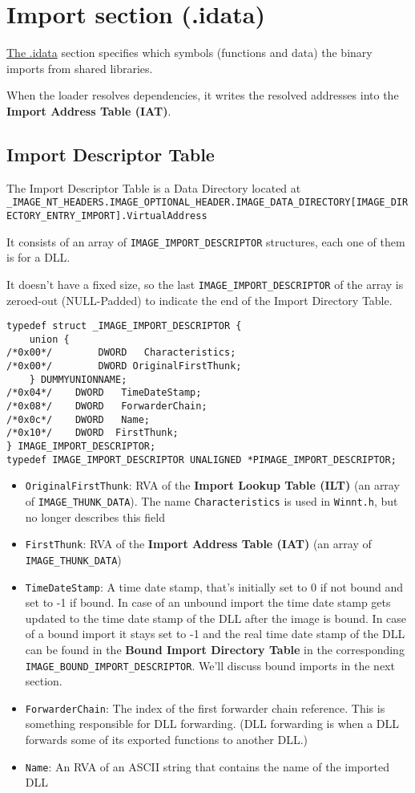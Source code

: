 \section{Import section (.idata)}
\href{https://learn.microsoft.com/en-us/windows/win32/debug/pe-format#the-idata-section}{The .idata} section specifies which symbols (functions and data) the binary imports from shared libraries.

When the loader resolves dependencies, it writes the resolved addresses into the {\bf Import Address Table (IAT)}.


\subsection{Import Descriptor Table}
The Import Descriptor Table is a Data Directory located at \verb+_IMAGE_NT_HEADERS.IMAGE_OPTIONAL_HEADER.IMAGE_DATA_DIRECTORY[IMAGE_DIRECTORY_ENTRY_IMPORT].VirtualAddress+

It consists of an array of \verb+IMAGE_IMPORT_DESCRIPTOR+ structures, each one of them is for a DLL.

It doesn’t have a fixed size, so the last \verb+IMAGE_IMPORT_DESCRIPTOR+ of the array is zeroed-out (NULL-Padded) to indicate the end of the Import Directory Table.

\begin{verbatim}
typedef struct _IMAGE_IMPORT_DESCRIPTOR {
    union {
/*0x00*/        DWORD   Characteristics;
/*0x00*/        DWORD OriginalFirstThunk;
    } DUMMYUNIONNAME;
/*0x04*/    DWORD   TimeDateStamp;
/*0x08*/    DWORD   ForwarderChain;
/*0x0c*/    DWORD   Name;
/*0x10*/    DWORD  FirstThunk;
} IMAGE_IMPORT_DESCRIPTOR;
typedef IMAGE_IMPORT_DESCRIPTOR UNALIGNED *PIMAGE_IMPORT_DESCRIPTOR;    
\end{verbatim}


\begin{itemize}
    \item \verb+OriginalFirstThunk+: RVA of the {\bf Import Lookup Table (ILT)} (an array of \verb+IMAGE_THUNK_DATA+). The name \verb+Characteristics+ is used in \verb+Winnt.h+, but no longer describes this field
    \item \verb+FirstThunk+: RVA of the {\bf Import Address Table (IAT)} (an array of \verb+IMAGE_THUNK_DATA+)
    \item \verb+TimeDateStamp+: A time date stamp, that’s initially set to 0 if not bound and set to -1 if bound. In case of an unbound import the time date stamp gets updated to the time date stamp of the DLL after the image is bound. In case of a bound import it stays set to -1 and the real time date stamp of the DLL can be found in the {\bf Bound Import Directory Table} in the corresponding \verb+IMAGE_BOUND_IMPORT_DESCRIPTOR+.
    We’ll discuss bound imports in the next section.
    \item \verb+ForwarderChain+: The index of the first forwarder chain reference. This is something responsible for DLL forwarding. (DLL forwarding is when a DLL forwards some of its exported functions to another DLL.)
    \item \verb+Name+: An RVA of an ASCII string that contains the name of the imported DLL
\end{itemize}


